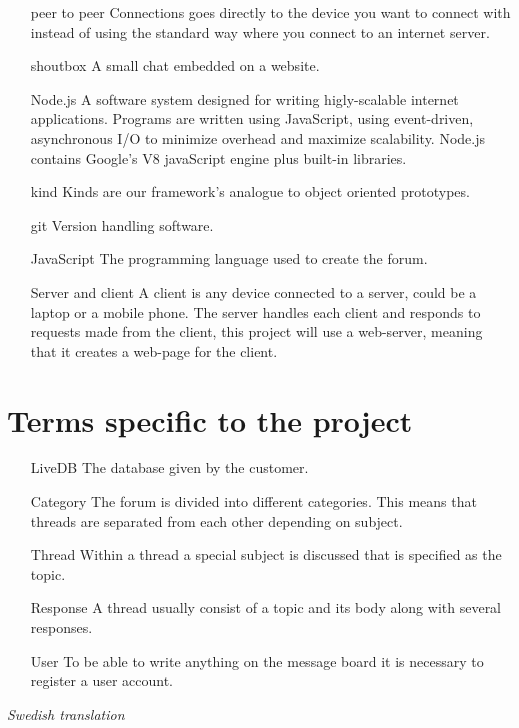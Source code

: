 \documentclass[a4paper, 12pt, titlepage]{article}
\begin{document}
\begin{itemize}
  \item[peer to peer] Connections goes directly to the device you want to connect with	 instead of using the standard way where you connect to an internet server.
  \item[shoutbox] A small chat embedded on a website. 
  \item[Node.js] A software system designed for writing higly-scalable internet applications. Programs are written using JavaScript, using event-driven, asynchronous I/O to minimize overhead and maximize scalability. Node.js contains Google's V8 javaScript engine plus built-in libraries.
	\item [kind] Kinds are our framework's analogue to object oriented prototypes.
	\item[git] Version handling software.
	\item[JavaScript] The programming language used to create the forum.
  	\item[Server and client] A client is any device connected to a server, could be a laptop or a mobile phone. The server handles each client and responds to requests made from the client, this project will use a web-server, meaning that it creates a web-page for 	the client.

\end{itemize}
\section{Terms specific to the project}

\begin{itemize}
	\item[LiveDB] The database given by the customer.
	\item[Category] The forum is divided into different categories. This means that threads are separated from each other depending on subject.
	\item [Thread] Within a thread a special subject is discussed that is specified as the topic.
	\item [Response] A thread usually consist of a topic and its body along with several responses.
	\item [User] To be able to write anything on the message board it is necessary to register a user account.\\
		
\end{itemize}
	\newpage
	\textit{Swedish translation} 
		
\end{document}
